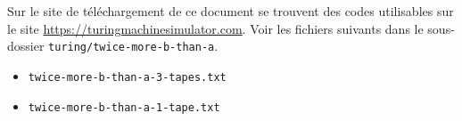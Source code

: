 Sur le site de téléchargement de ce document se trouvent des codes utilisables sur le site \url{https://turingmachinesimulator.com}.
Voir les fichiers suivants dans le sous-dossier \verb+turing/twice-more-b-than-a+.
\begin{itemize}[label=\small\textbullet]
    \item \verb+twice-more-b-than-a-3-tapes.txt+

    \item \verb+twice-more-b-than-a-1-tape.txt+
\end{itemize}
